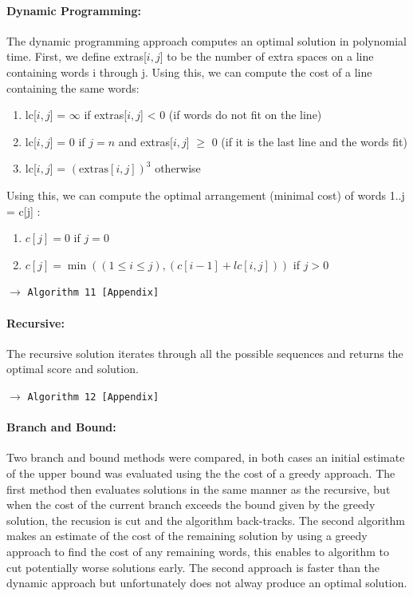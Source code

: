 \documentclass[a4paper,12pt]{article}
\newcommand{\see}[1]{\begin{flushright}$\rightarrow$ \texttt{#1 [Appendix]}\end{flushright}}
\newcommand{\seeAlgorithm}[1]{\see{Algorithm #1}}
\begin{document}
			\paragraph{Dynamic Programming:} The dynamic programming approach computes an optimal solution in polynomial time. First, we define extras[$i,j$] to be the number of extra spaces on a line containing words i through j. Using this, we can compute the cost of a line containing the same words:
			\begin{enumerate}
				\item lc[$i,j$] = $\infty$ 			if extras[$i,j$] < 0   (if words do not fit on the line)
				\item lc[$i,j$] = 0    				if $j = n$ and extras[$i,j$] $\geq$ 0   (if it is the last line and the words fit)
				\item lc[$i,j$] = $(\text{extras}[i,j])^3$ 	otherwise
			\end{enumerate}
			Using this, we can compute the optimal arrangement (minimal cost) of words 1..j = c[j] :
			\begin{enumerate}
				\item $c[j] = 0$ if $j = 0$
				\item $c[j] = \min((1\leq i\leq j),(c[i-1] + lc[i,j]))$ if $j>0$
			\end{enumerate}
			\seeAlgorithm{11}

			\paragraph{Recursive:} The recursive solution iterates through all the possible sequences and returns the optimal score and solution.
			\seeAlgorithm{12}

			\paragraph{Branch and Bound:} Two branch and bound methods were compared, in both cases an initial estimate of the upper bound was evaluated using the the cost of a greedy approach. The first method then evaluates solutions in the same manner as the recursive, but when the cost of the current branch exceeds the bound given by the greedy solution, the recusion is cut and the algorithm back-tracks. The second algorithm makes an estimate of the cost of the remaining solution by using a greedy approach to find the cost of any remaining words, this enables to algorithm to cut potentially worse solutions early. The second approach is faster than the dynamic approach but unfortunately does not alway produce an optimal solution.
\end{document}
